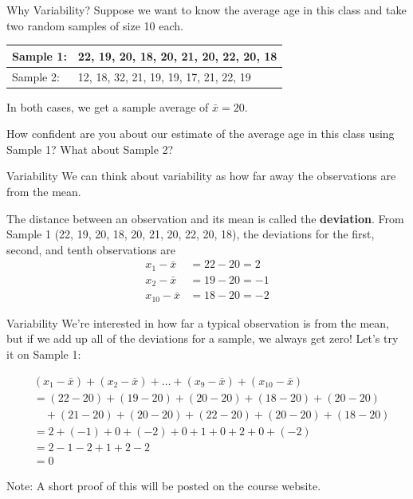 \begin{frame}{Why Variability?}
    Suppose we want to know the average age in this class and take two random samples of size 10 each. 
    
    \begin{table}[]
    \begin{tabular}{ll}
    Sample 1: & 22, 19, 20, 18, 20, 21, 20, 22, 20, 18\\ 
    \hline
    Sample 2: & 12, 18, 32, 21, 19, 19, 17, 21, 22, 19
    \end{tabular}
    \end{table}

    In both cases, we get a sample average of $\bar{x}=20$.
    
    \vspace{12pt}How confident are you about our estimate of the average age in this class using Sample 1? What about Sample 2?
\end{frame}

\begin{frame}{Variability}
    We can think about variability as how far away the observations are from the mean. 
    
    \vspace{12pt}The distance between an observation and its mean is called the \textbf{deviation}. From Sample 1 (22, 19, 20, 18, 20, 21, 20, 22, 20, 18), the deviations for the first, second, and tenth observations are
    \begin{align*}
        x_1 - \bar{x} &= 22-20 = 2 \\
        x_2 - \bar{x} &= 19-20 = -1 \\
        x_{10}-\bar{x} &= 18-20=-2
    \end{align*}
\end{frame}

\begin{frame}{Variability}
    We're interested in how far a typical observation is from the mean, but if we add up all of the deviations for a sample, we always get zero! Let's try it on Sample 1:
    
    \begin{align*}
        & (x_1 - \bar{x}) + (x_2 - \bar{x}) + \dots + (x_9 - \bar{x}) + (x_{10} - \bar{x}) \\
        &= (22-20) + (19-20) + (20-20) + (18-20) + (20-20) \\ & \quad + (21-20) + (20-20) + (22-20) + (20-20) + (18-20) \\
        &= 2 + (-1) + 0 + (-2) + 0 + 1 + 0 + 2 + 0 + (-2) \\
        &= 2 - 1 - 2 + 1 + 2 - 2 \\
        &= 0
    \end{align*}
    
    Note: A short proof of this will be posted on the course website.
\end{frame}

